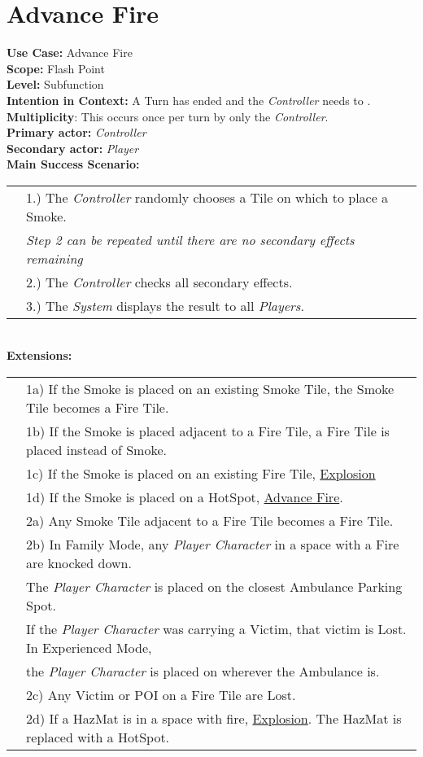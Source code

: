 \documentclass{article}
\begin{document}
	\section*{Advance Fire}
	\textbf{Use Case:} Advance Fire\\
	\textbf{Scope:} Flash Point\\
	\textbf{Level:} Subfunction\\
	\textbf{Intention in Context:} A Turn has ended and the \textit{Controller} needs to .\\
	\textbf{Multiplicity}: This occurs once per turn by only the \textit{Controller}.\\
	\textbf{Primary actor:} \textit{Controller}\\
	\textbf{Secondary actor:} \textit{Player}\\
	\textbf{Main Success Scenario:}\\
	\begin{tabular}{l l}
		&1.) The \textit{Controller} randomly chooses a Tile on which to place a Smoke.\\
		&\textit{Step 2 can be repeated until there are no secondary effects remaining}\\
		&2.) The \textit{Controller} checks all secondary effects.\\
		&3.) The \textit{System} displays the result to all \textit{Players}.
	\end{tabular}\\
	\textbf{Extensions: }\\
	\begin{tabular}{l l}
		&1a) If the Smoke is placed on an existing Smoke Tile, the Smoke Tile becomes a Fire Tile.\\
		&1b) If the Smoke is placed adjacent to a Fire Tile, a Fire Tile is placed instead of Smoke.\\
		&1c) If the Smoke is placed on an existing Fire Tile, \underline{Explosion}\\
		&1d) If the Smoke is placed on a HotSpot, \underline{Advance Fire}.\\
		&2a) Any Smoke Tile adjacent to a Fire Tile becomes a Fire Tile. \\
		&2b) In Family Mode, any \textit{Player Character} in a space with a Fire are knocked down.\\
		&\qquad The \textit{Player Character} is placed on the closest Ambulance Parking Spot.\\
		&\qquad If the \textit{Player Character} was carrying a Victim, that victim is Lost. In Experienced Mode,\\
		&\qquad the \textit{Player Character} is placed on wherever the Ambulance is.\\
		&2c) Any Victim or POI on a Fire Tile are Lost.\\
		&2d) If a HazMat is in a space with fire,  \underline{Explosion}. The HazMat is replaced with a HotSpot.\\
	\end{tabular}
\end{document}
